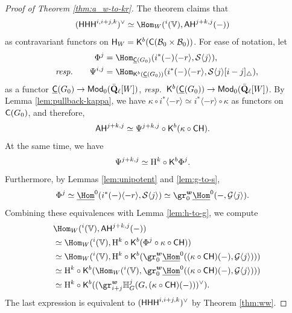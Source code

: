 \documentclass[a4paper,10pt,leqno]{amsart}
\theoremstyle{plain}
\theoremstyle{plain}
\theoremstyle{plain}
\theoremstyle{definition}
\theoremstyle{remark}
\let\Alt\relax
\DeclareMathOperator{\Alt}{\text{$\Lambda$}}
\newcommand{\QL}{\bar{\mathbf{Q}}_\ell}
\begin{document}
\begin{proof}[Proof of Theorem \ref{thm:a_w-to-kr}]
The theorem claims that
\begin{align}
(\sf{HHH}^{i, i + j, k})^\vee
&\simeq \Hom_W(\Alt^i(\bb{V}), \sf{AH}^{j + k, j}(-))
\end{align}
as contravariant functors on $\sf{H}_W = \sf{K}^b(\sf{C}(\cal{B}_0 \times \cal{B}_0))$.
For ease of notation, let 
\begin{align}
\Phi^j &= \Hom_{\underline{\sf{C}}(G_0)}(i^\ast (-)\langle -r\rangle, \cal{S}\langle j\rangle),\\
\emph{resp.}\qquad
\Psi^{i, j} &= \Hom_{\sf{K}^b(\underline{\sf{C}}(G_0))}(i^\ast(-)\langle -r\rangle, \cal{S}\langle j\rangle [i - j]_\triangle),
\end{align}
as a functor $\underline{\sf{C}}(G_0) \to \sf{Mod}_0(\QL[W])$, \emph{resp.}\ $\sf{K}^b(\underline{\sf{C}}(G_0)) \to \sf{Mod}_0(\QL[W])$.
By Lemma \ref{lem:pullback-kappa}, we have $\kappa \circ i^\ast \langle -r\rangle \simeq i^\ast\langle -r\rangle \circ \kappa$ as functors on $\sf{C}(G_0)$, and therefore,
\begin{align}
\sf{AH}^{j + k, j} 
&\simeq
	\Psi^{j + k, j} \circ \sf{K}^b(\kappa \circ \sf{CH}).
\end{align}
At the same time, we have
\begin{align}
\Psi^{j + k, j}
&\simeq
	\ur{H}^k \circ \sf{K}^b\Phi^j.
\end{align}
Furthermore, by Lemmas \ref{lem:unipotent} and \ref{lem:g-to-s},
\begin{align}\begin{split}
\Phi^j
&\simeq
	\SHom^0(i^\ast(-)\langle -r\rangle, \cal{S}\langle j\rangle)
\simeq
	\gr_0^{\bm{w}} \SHom^0(-, \cal{G}\langle j\rangle).
\end{split}\end{align}
Combining these equivalences with Lemma \ref{lem:h-to-g}, we compute
\begin{align}\begin{split}
&\Hom_W(\Alt^i(\bb{V}), \sf{AH}^{j + k, j}(-))\\
&\simeq
	\Hom_W(\Alt^i(\bb{V}), \ur{H}^k \circ \sf{K}^b(\Phi^j \circ \kappa \circ \sf{CH}))
		\\
&\simeq
	\Hom_W(\Alt^i(\bb{V}), \ur{H}^k \circ \sf{K}^b(\gr_0^{\bm{w}} \SHom^0((\kappa \circ \sf{CH})(-), \cal{G}\langle j\rangle)))\\
&\simeq
	\ur{H}^k \circ \sf{K}^b(
	\Hom_W(\Alt^i(\bb{V}),\gr_0^{\bm{w}} \SHom^0((\kappa \circ \sf{CH})(-), \cal{G}\langle j\rangle)))\\
&\simeq
	\ur{H}^k \circ \sf{K}^b(
	(\gr_{i + j}^{\bm{w}} 
		\bb{H}_G^j(G, (\kappa \circ \sf{CH})(-))
	)^\vee).
\end{split}\end{align}
The last expression is equivalent to $(\sf{HHH}^{i, i + j, k})^\vee$ by Theorem \ref{thm:ww}.
\end{proof}
\end{document}
